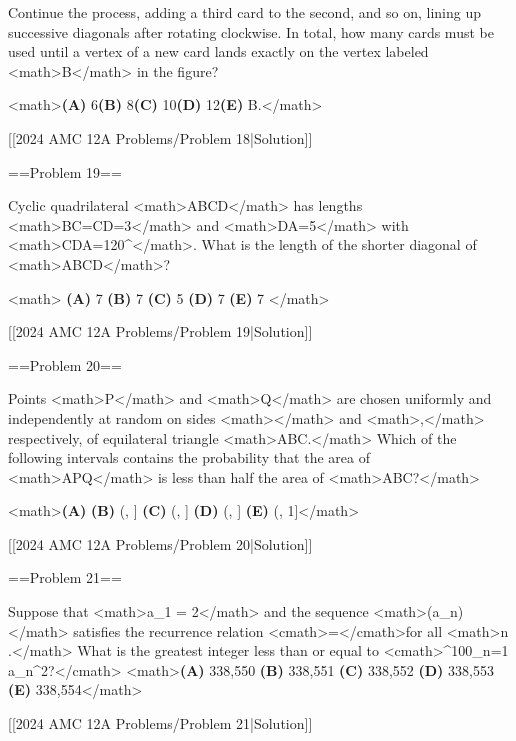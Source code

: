 Continue the process, adding a third card to the second, and so on, lining up successive diagonals after rotating clockwise. In total, how many cards must be used until a vertex of a new card lands exactly on the vertex labeled <math>B</math> in the figure?

<math>\textbf{(A) }6\qquad\textbf{(B) }8\qquad\textbf{(C) }10\qquad\textbf{(D) }12\qquad\textbf{(E) }B.</math>

[[2024 AMC 12A Problems/Problem 18|Solution]]

==Problem 19==

Cyclic quadrilateral <math>ABCD</math> has lengths <math>BC=CD=3</math> and <math>DA=5</math> with <math>\angle CDA=120^\circ</math>. What is the length of the shorter diagonal of <math>ABCD</math>?

<math>
\textbf{(A) }7 \qquad
\textbf{(B) }7 \qquad
\textbf{(C) }5 \qquad
\textbf{(D) }7 \qquad
\textbf{(E) }7 \qquad
</math>

[[2024 AMC 12A Problems/Problem 19|Solution]]

==Problem 20==

Points <math>P</math> and <math>Q</math> are chosen uniformly and independently at random on sides <math></math> and <math>,</math> respectively, of equilateral triangle <math>\Delta ABC.</math> Which of the following intervals contains the probability that the area of <math>\triangle APQ</math> is less than half the area of <math>\triangle ABC?</math>

<math>\textbf{(A) }  \qquad \textbf{(B) } \left(, \right] \qquad \textbf{(C) } \left(, \right] \qquad \textbf{(D) } \left(, \right] \qquad \textbf{(E) } \left(, 1\right]</math>

[[2024 AMC 12A Problems/Problem 20|Solution]]

==Problem 21==

Suppose that <math>a_1 = 2</math> and the sequence <math>(a_n)</math> satisfies the recurrence relation <cmath>=</cmath>for all <math>n .</math> What is the greatest integer less than or equal to <cmath>\sum^{100}_{n=1} a_n^2?</cmath>
<math>\textbf{(A) } 338{,}550 \qquad \textbf{(B) } 338{,}551 \qquad \textbf{(C) } 338{,}552 \qquad \textbf{(D) } 338{,}553 \qquad \textbf{(E) } 338{,}554</math>

[[2024 AMC 12A Problems/Problem 21|Solution]]


